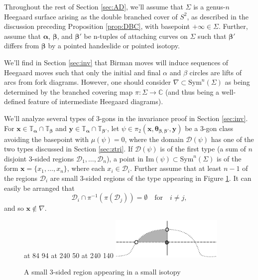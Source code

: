 \documentclass[11pt]{article}
\theoremstyle{plain} \newtheorem{thm}{Theorem}[subsection]
\theoremstyle{plain} \newtheorem{cor}[thm]{Corollary}
\theoremstyle{plain} \newtheorem{prop}[thm]{Proposition}
\theoremstyle{plain} \newtheorem{conj}[thm]{Conjecture}
\theoremstyle{plain} \newtheorem{lem}[thm]{Lemma}
\theoremstyle{definition} \newtheorem{df}[thm]{Definition}
\theoremstyle{remark} \newtheorem{rmk}[thm]{Remark}
\theoremstyle{remark} \newtheorem{obs}[thm]{Observation}
\newcommand{\ba}{\boldsymbol{\alpha}}
\newcommand{\bb}{\boldsymbol{\beta}}
\newcommand{\Ta}{\mathbb{T}_{\ba}}
\newcommand{\Tb}{\mathbb{T}_{\bb}}
\newcommand{\bx}{\mathbf{x}}
\newcommand{\by}{\mathbf{y}}
\newcommand{\thet}[1]{\boldsymbol{\theta}_{#1}}
\newcommand{\tor}[1]{\mathbb{T}_{#1}}
\newcommand{\AD}{\nabla}
\begin{document}
Throughout the rest of Section \ref{sec:AD}, we'll assume that $\Sigma$ is a genus-$n$ Heegaard surface arising as the double branched cover of $S^2$, as described in the discussion preceding Proposition \ref{prop:DBC}, with basepoint $+\infty \in \Sigma$.  Further, assume that $\ba$, $\bb$, and $\bb'$ be n-tuples of attaching curves on $\Sigma$ such that $\bb'$ differs from $\bb$ by a pointed handeslide or pointed isotopy.

We'll find in Section \ref{sec:inv} that Birman moves will induce sequences of Heegaard moves  such that only the initial and final $\alpha$ and $\beta$ circles are lifts of arcs from fork diagrams.  However, one should consider $\AD \subset \text{Sym}^{n}(\Sigma)$ as being determined by the branched covering map $\pi: \Sigma \rightarrow \mathbb{C}$ (and thus being a well-defined feature of intermediate Heegaard diagrams).

We'll analyze several types of 3-gons in the invariance proof in Section \ref{sec:inv}.  For $\bx \in \Ta \cap \Tb$ and $\by \in \Ta \cap \tor{\bb'}$, let $\psi \in \pi_{2}(\bx,\thet{\bb,\bb'},\by)$ be a 3-gon class avoiding the basepoint with $\mu(\psi) = 0$, where the domain $\mathcal{D}(\psi)$ has one of the two types discussed in Section \ref{sec:ztri}.  If $\mathcal{D}(\psi)$ is of the first type (a sum of $n$ disjoint 3-sided regions $\mathcal{D}_1, \ldots, \mathcal{D}_n$), a point in $\text{Im}(\psi) \subset \text{Sym}^n(\Sigma)$ is of the form $\bx = \{ x_1, \ldots, x_n\}$, where each $x_i \in \mathcal{D}_i$.  Further assume that at least $n-1$ of the regions $\mathcal{D}_i$ are small 3-sided regions of the type appearing in Figure \ref{fig:smalltri}.  It can easily be arranged that
\begin{equation}\label{eqn:adtri}
\mathcal{D}_i \cap \pi^{-1} \left( \pi \left( \mathcal{D}_j \right) \right) = \emptyset \quad \text{for} \quad i \neq j,
\end{equation}
and so $\bx \notin \AD.$

\begin{figure}[h!]
\centering
\begin{minipage}[c]{.38\linewidth}
\small
\pinlabel* {$\theta_{\bb \bb'}$} at 84 94
 at 240 50
 at 240 140
\endlabellist
\includegraphics[height = 20mm]{smalltri}
\end{minipage}
\begin{minipage}[c]{.60\linewidth}
\caption[A small triangle]{A small 3-sided region appearing in a small isotopy}
\label{fig:smalltri}
\end{minipage}
\end{figure}
\end{document}
